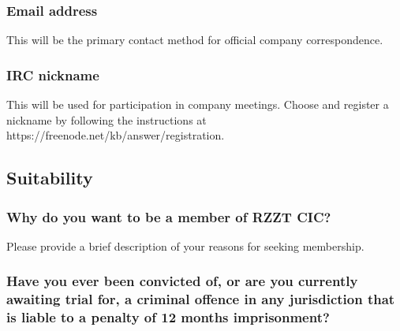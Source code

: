 \documentclass[a4paper,10pt]{article}
\begin{document}
\begin{Form}
\begin{framed}%
  \TextField[width=\textwidth,donotscroll=true,multiline=true,name=address]{ }%
\end{framed}%

\subsubsection{Email address}

This will be the primary contact method for official company correspondence.

\begin{framed}%
  \TextField[width=\textwidth,donotscroll=true,name=email]{ }%
\end{framed}%

\subsubsection{IRC nickname}

This will be used for participation in company meetings. Choose and register a nickname by following the instructions at https://freenode.net/kb/answer/registration.

\begin{framed}%
  \TextField[width=\textwidth,donotscroll=true,name=ircnick]{ }%
\end{framed}%

\newpage

\subsection{Suitability}

\subsubsection{Why do you want to be a member of RZZT CIC?}

Please provide a brief description of your reasons for seeking membership.

\begin{framed}%
  \TextField[width=\textwidth,donotscroll=true,multiline=true,name=reasons]{ }%
\end{framed}%

\subsubsection{Have you ever been convicted of, or are you currently awaiting trial for, a criminal offence in any jurisdiction that is liable to a penalty of 12 months imprisonment?}


\end{Form}
\end{document}
